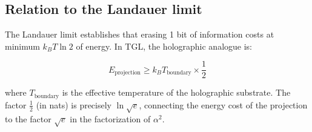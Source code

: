 \documentclass[12pt,a4paper,twoside]{article}
\newcommand{\alphaii}{\alpha^{2}}
\begin{document}
\subsection{Relation to the Landauer limit}

The Landauer limit \cite{Landauer1961} establishes that erasing 1 bit of information costs at minimum $k_B T \ln 2$ of energy. In TGL, the holographic analogue is:

\begin{equation}
E_{\text{projection}} \geq k_B T_{\text{boundary}} \times \frac{1}{2}
\end{equation}

\noindent where $T_{\text{boundary}}$ is the effective temperature of the holographic substrate. The factor $\frac{1}{2}$ (in nats) is precisely $\ln\sqrt{e}$, connecting the energy cost of the projection to the factor $\sqrt{e}$ in the factorization of $\alphaii$.


\end{document}
